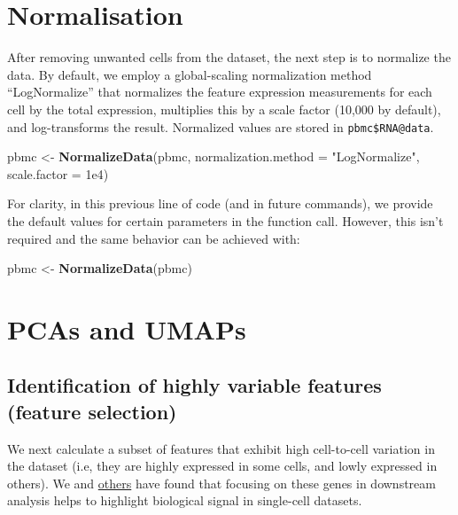 \documentclass[
]{book}
\newenvironment{Shaded}{\begin{snugshade}}{\end{snugshade}}
\newcommand{\AttributeTok}[1]{\textcolor[rgb]{0.13,0.29,0.53}{#1}}
\newcommand{\FloatTok}[1]{\textcolor[rgb]{0.00,0.00,0.81}{#1}}
\newcommand{\FunctionTok}[1]{\textcolor[rgb]{0.13,0.29,0.53}{\textbf{#1}}}
\newcommand{\NormalTok}[1]{#1}
\newcommand{\OtherTok}[1]{\textcolor[rgb]{0.56,0.35,0.01}{#1}}
\newcommand{\StringTok}[1]{\textcolor[rgb]{0.31,0.60,0.02}{#1}}
\begin{document}
\hypertarget{norm}{%
\chapter{Normalisation}\label{norm}}

After removing unwanted cells from the dataset, the next step is to normalize the data. By default, we employ a global-scaling normalization method ``LogNormalize'' that normalizes the feature expression measurements for each cell by the total expression, multiplies this by a scale factor (10,000 by default), and log-transforms the result. Normalized values are stored in \texttt{pbmc\$RNA@data}.

\begin{Shaded}
\begin{Highlighting}[]
\NormalTok{pbmc }\OtherTok{\textless{}{-}} \FunctionTok{NormalizeData}\NormalTok{(pbmc, }\AttributeTok{normalization.method =} \StringTok{"LogNormalize"}\NormalTok{, }\AttributeTok{scale.factor =} \FloatTok{1e4}\NormalTok{)}
\end{Highlighting}
\end{Shaded}

For clarity, in this previous line of code (and in future commands), we provide the default values for certain parameters in the function call. However, this isn't required and the same behavior can be achieved with:

\begin{Shaded}
\begin{Highlighting}[]
\NormalTok{pbmc }\OtherTok{\textless{}{-}} \FunctionTok{NormalizeData}\NormalTok{(pbmc)}
\end{Highlighting}
\end{Shaded}

\hypertarget{reducedims}{%
\chapter{PCAs and UMAPs}\label{reducedims}}

\hypertarget{identification-of-highly-variable-features-feature-selection}{%
\section{Identification of highly variable features (feature selection)}\label{identification-of-highly-variable-features-feature-selection}}

We next calculate a subset of features that exhibit high cell-to-cell variation in the dataset (i.e, they are highly expressed in some cells, and lowly expressed in others). We and \href{https://www.nature.com/articles/nmeth.2645}{others} have found that focusing on these genes in downstream analysis helps to highlight biological signal in single-cell datasets.
\end{document}
